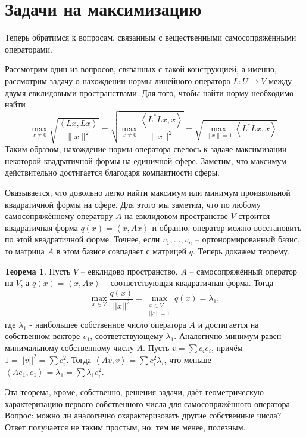 \documentclass[12pt,a4paper,oneside]{book}
\theoremstyle{definition}
\newtheorem{thm}{\color{red!40!black}Теорема}
\def\lan{\left\langle }
\def\ran{\right\rangle}
\def\thrm{\begin{thm}}
\def\ethrm{\end{thm}}
\begin{document}
\section{Задачи на максимизацию}

Теперь обратимся к вопросам, связанным с вещественными самосопряжёнными операторами.

Рассмотрим один из вопросов, связанных с такой конструкцией, а именно, рассмотрим задачу о нахождении нормы линейного оператора $L \colon U \to V$ между двумя евклидовыми пространствами. Для того, чтобы найти  норму необходимо найти
$$\max_{x\neq 0}\sqrt{\frac{\lan Lx,Lx\ran}{\|x\|^2}}=\sqrt{\max_{x\neq 0}\frac{\lan L^*Lx,x\ran}{\|x\|^2}}=\sqrt{\max_{\|x\|=1} \lan L^*Lx,x\ran}.$$
Таким образом, нахождение нормы оператора свелось к задаче максимизации некоторой квадратичной формы на единичной сфере. Заметим, что максимум действительно достигается благодаря компактности сферы.

Оказывается, что довольно легко найти максимум или минимум произвольной квадратичной формы на сфере. Для этого мы заметим, что по любому самосопряжённому оператору $A$ на евклидовом пространстве $V$ строится квадратичная форма $q(x)=\lan x, Ax\ran$ и обратно, оператор можно восстановить по этой квадратичной форме. Точнее, если $v_1,\dots,v_n$ -- ортонормированный базис, то матрица $A$ в этом базисе совпадает с матрицей $q$. Теперь докажем теорему.



\thrm Пусть $V$ -- евклидово пространство, $A$ -- самосопряжённый оператор на $V$, а $q(x)=\lan x,Ax\ran$ -- соответствующая квадратичная форма. Тогда 
$$\max_{ x\in V } \frac{q(x)}{||x||^2}=\max_{\substack{ x\in V \\ ||x||=1}} q(x)=\lambda_1,$$
где $\lambda_1$ - наибольшее собственное число оператора $A$ и достигается на собственном векторе $v_1$, соответствующему $\lambda_1$. Аналогично минимум равен минимальному собственному числу $A$. 
\proof
Пусть $v=\sum c_i e_i$, причём $1=||v||^2=\sum c_i^2$. Тогда $\lan Av,v\ran = \sum c^2_i \lambda_i $, что меньше $\lan A e_1,e_1\ran= \lambda_1= \sum \lambda_1 c_i^2$.
\endproof
\ethrm

Эта теорема, кроме, собственно, решения задачи, даёт геометрическую характеризацию первого собственного числа для самосопряжённого оператора. Вопрос: можно ли аналогично охарактеризовать другие собственные числа? Ответ получается не таким простым, но, тем не менее, полезным.
\end{document}
